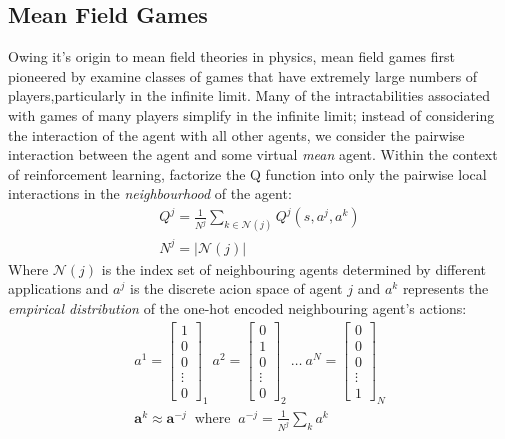\subsection{Mean Field Games}
Owing it's origin to mean field theories in physics, mean field games
first pioneered by \cite{Lasry2007} examine classes of games that have extremely large
numbers of players,particularly in the infinite limit. Many of the intractabilities
associated with games of many players simplify in the infinite limit; instead of considering
the interaction of the agent with all other agents, we consider the pairwise interaction
between the agent and some virtual \emph{mean} agent. Within the context of reinforcement
learning, \cite{Yang} factorize the Q function into only the pairwise local interactions
in the \emph{neighbourhood} of the agent:
\begin{equation}
    \begin{gathered}
        Q^j = \frac{1}{N^j} \sum_{k \in \mathcal{N}(j)}Q^j(s,a^j, a^k) \\
        N^j = \vert \mathcal{N}(j) \vert
    \end{gathered}
\end{equation}
Where $\mathcal{N}(j)$ is the index set of neighbouring agents determined by different applications
and $a^j$ is the discrete acion space of agent $j$ and $a^k$ represents the \emph{empirical distribution}
of the one-hot encoded neighbouring agent's actions:
\begin{equation}
    \begin{gathered}
        a^1 = \begin{bmatrix}
            1\\0\\0\\\vdots\\0
        \end{bmatrix}_1
        \;a^2 = \begin{bmatrix}
            0\\1\\0\\\vdots\\0
        \end{bmatrix}_2 \; \hdots\:
        a^N = \begin{bmatrix}
            0\\0\\0\\\vdots\\1
        \end{bmatrix}_N\\
        \mathbf{a}^k \approx \mathbf{a}^{-j} \;\; \text{where} \;\; a^{-j} = \frac{1}{N^j} \sum_k a^k
    \end{gathered}
\end{equation}
